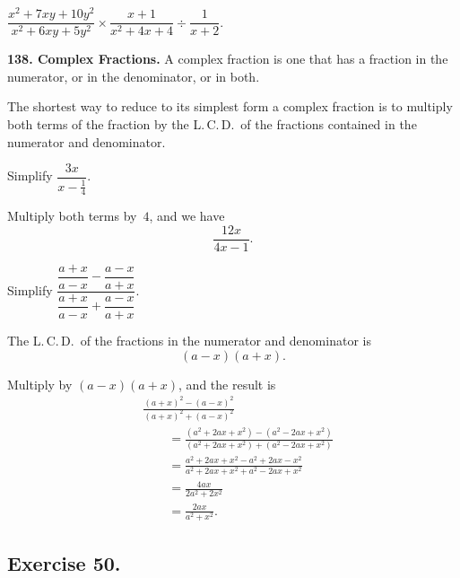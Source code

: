 \documentclass[12pt]{book}[2005/09/16]
\newcommand{\Require}[1][2\baselineskip]{%
  \setlength{\TmpLen}{\pagegoal-\pagetotal}%
  \ifthenelse{\lengthtest{0pt < \TmpLen}\and\lengthtest{\TmpLen < #1}}{%
    \vfil\newpage%
  }{}%
}
\newcommand{\Paragraph}[1]{\medskip\par\textbf{#1}}
\newcommand{\Exercise}[2][]{%
  \Require[3\baselineskip]
  \subsection*{\centering\small Exercise #2}
  \ifthenelse{\not\equal{#1}{}}{%
    \subsubsection*{\centering\normalfont\small\scshape #1}
  }{}
  \phantomsection\label{exer:#2}%
}
\newcommand{\Item}[1]{\vspace{4pt plus 16pt}\makebox[1em][r]{\textbf{#1}\ }}
\newlength{\TmpLen}
\newcommand{\LCD}{L.\,C.\,D.}
\begin{document}
\Item{20.}  $\dfrac{x^{2} + 7xy + 10y^{2}}{x^{2} + 6xy + 5y^{2}} × \dfrac{x + 1}{x^{2} + 4x + 4} ÷ \dfrac{1}{x + 2}$.

\Paragraph{138.  Complex Fractions.}  A complex fraction is one that
has a fraction in the numerator, or in the denominator, or
in both.

The shortest way to reduce to its simplest form a complex
fraction is to multiply both terms of the fraction by
the \LCD\ of the fractions contained in the numerator and
denominator.

\Item{1.}  Simplify $\dfrac{3x}{x - \frac{1}{4}}$.

Multiply both terms by~$4$, and we have
\[
\frac{12x}{4x - 1}.
\]

\Item{2.}  Simplify $\dfrac{\dfrac{a + x}{a - x} - \dfrac{a - x}{a + x}}{\dfrac{a + x}{a - x} + \dfrac{a - x}{a + x}}$.

The \LCD\ of the fractions in the numerator and denominator
is
\[
(a - x)(a + x).
\]

Multiply by $(a - x)(a + x)$, and the result is
\begin{align*}
&\frac{(a + x)^{2} - (a - x)^{2}}{(a + x)^{2} + (a - x)^{2}} \\
&\qquad= \frac{(a^{2} + 2ax + x^{2}) - (a^{2} - 2ax + x^{2})}
               {(a^{2} + 2ax + x^{2}) + (a^{2} - 2ax + x^{2})} \\
&\qquad= \frac{a^{2} + 2ax + x^{2} - a^{2} + 2ax - x^{2}}
               {a^{2} + 2ax + x^{2} + a^{2} - 2ax + x^{2}} \\
&\qquad= \frac{4ax}{2a^{2} + 2x^{2}} \\
&\qquad= \frac{2ax}{a^{2} + x^{2}}.
\end{align*}

\Exercise{50.}
\end{document}
